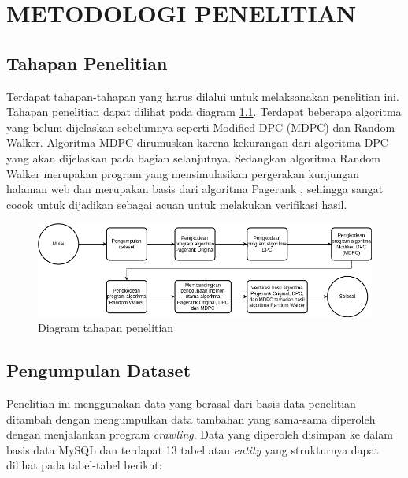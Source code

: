 
\chapter{METODOLOGI PENELITIAN}

\section{Tahapan Penelitian}

Terdapat tahapan-tahapan yang harus dilalui untuk melaksanakan penelitian ini. Tahapan penelitian dapat dilihat pada diagram \ref{gambar:tahapan_penelitian}. Terdapat beberapa algoritma yang belum dijelaskan sebelumnya seperti Modified DPC (MDPC) dan Random Walker. Algoritma MDPC dirumuskan karena kekurangan dari algoritma DPC yang akan dijelaskan pada bagian selanjutnya. Sedangkan algoritma Random Walker merupakan program yang mensimulasikan pergerakan kunjungan halaman web dan merupakan basis dari algoritma Pagerank \citep{ilprints422}, sehingga sangat cocok untuk dijadikan sebagai acuan untuk melakukan verifikasi hasil.

\begin{figure}[H]
	\centering
	\includegraphics[keepaspectratio, width=\textwidth]{gambar/tahapan_penelitian.png}
	\caption{Diagram tahapan penelitian}
	\label{gambar:tahapan_penelitian}
\end{figure}

\section{Pengumpulan Dataset}

Penelitian ini menggunakan data yang berasal dari basis data penelitian \citet{khatulistiwa2022SearchEngine} ditambah dengan mengumpulkan data tambahan yang sama-sama diperoleh dengan menjalankan program \textit{crawling}. Data yang diperoleh disimpan ke dalam basis data MySQL dan terdapat 13 tabel atau \textit{entity} yang strukturnya dapat dilihat pada tabel-tabel berikut:
	
